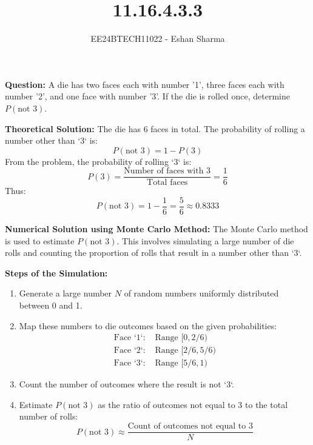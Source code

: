 \documentclass[journal]{IEEEtran}
\begin{document}
	
	\vspace{3cm}
	\title{11.16.4.3.3}
	\author{EE24BTECH11022 - Eshan Sharma}
	{\let\newpage\relax\maketitle}
	\renewcommand{\thefigure}{\theenumi}
	\renewcommand{\thetable}{\theenumi}
	\setlength{\intextsep}{10pt} %
	
	\textbf{Question:}  
	A die has two faces each with number '1', three faces each with number '2', and one face with number '3'. If the die is rolled once, determine \( P(\text{not } 3) \).  
	
	\textbf{Theoretical Solution:}  
	The die has 6 faces in total. The probability of rolling a number other than `3` is:
	\[
	P(\text{not } 3) = 1 - P(3)
	\]
	From the problem, the probability of rolling `3` is:
	\[
	P(3) = \frac{\text{Number of faces with 3}}{\text{Total faces}} = \frac{1}{6}
	\]
	Thus:
	\[
	P(\text{not } 3) = 1 - \frac{1}{6} = \frac{5}{6} \approx 0.8333
	\]
	
	\textbf{Numerical Solution using Monte Carlo Method:}  
	The Monte Carlo method is used to estimate \( P(\text{not } 3) \). This involves simulating a large number of die rolls and counting the proportion of rolls that result in a number other than `3`.
	
	\textbf{Steps of the Simulation:}  
	\begin{enumerate}
		\item Generate a large number \( N \) of random numbers uniformly distributed between 0 and 1.
		\item Map these numbers to die outcomes based on the given probabilities:
		\begin{align*}
			\text{Face `1`: } & \text{Range } [0, 2/6) \\
			\text{Face `2`: } & \text{Range } [2/6, 5/6) \\
			\text{Face `3`: } & \text{Range } [5/6, 1)
		\end{align*}
		\item Count the number of outcomes where the result is not `3`.
		\item Estimate \( P(\text{not } 3) \) as the ratio of outcomes not equal to 3 to the total number of rolls:
		\[
		P(\text{not } 3) \approx \frac{\text{Count of outcomes not equal to 3}}{N}
		\]
	\end{enumerate}
	
\end{document}

